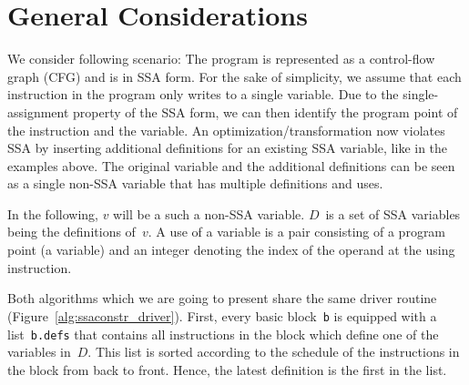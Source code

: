 \section{General Considerations}
We consider following scenario:
The program is represented as a control-flow graph (CFG) and is in SSA form.
For the sake of simplicity, we assume that each instruction in the program only writes to a single variable.
Due to the single-assignment property of the SSA form, we can then identify the program point of the instruction and the variable. 
An optimization/transformation now violates SSA by inserting additional definitions for an existing SSA variable, like in the examples above.
The original variable and the additional definitions can be seen as a single non-SSA variable that has multiple definitions and uses.

In the following, $v$ will be a such a non-SSA variable.
$D$~is a set of SSA variables being the definitions of~$v$.
A use of a variable is a pair consisting of a program point (a variable) and an integer denoting the index of the operand at the using instruction.

Both algorithms which we are going to present share the same driver routine (Figure~\ref{alg:ssaconstr_driver}).
First, every basic block~\verb|b| is equipped with a list~\verb|b.defs| that contains all instructions in the block which define one of the variables in~$D$.
This list is sorted according to the schedule of the instructions in the block from back to front.
Hence, the latest definition is the first in the list.

